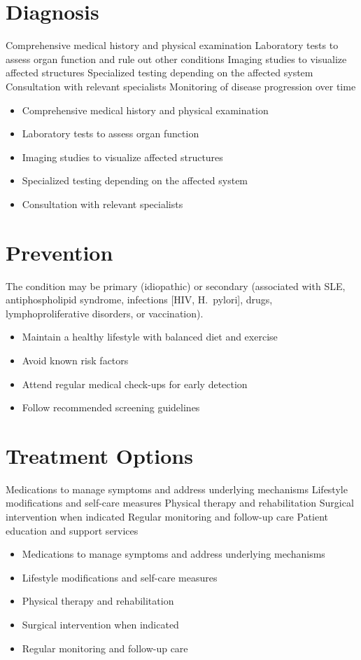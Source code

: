 \section{Diagnosis}
Comprehensive medical history and physical examination Laboratory tests to assess organ function and rule out other conditions Imaging studies to visualize affected structures Specialized testing depending on the affected system Consultation with relevant specialists Monitoring of disease progression over time

\begin{itemize}[noitemsep]
  \item Comprehensive medical history and physical examination
  \item Laboratory tests to assess organ function
  \item Imaging studies to visualize affected structures
  \item Specialized testing depending on the affected system
  \item Consultation with relevant specialists
\end{itemize}
\section{Prevention}
The condition may be primary (idiopathic) or secondary (associated with SLE, antiphospholipid syndrome, infections [HIV, H.~pylori], drugs, lymphoproliferative disorders, or vaccination).

\begin{itemize}[noitemsep]
  \item Maintain a healthy lifestyle with balanced diet and exercise
  \item Avoid known risk factors
  \item Attend regular medical check-ups for early detection
  \item Follow recommended screening guidelines
\end{itemize}
\section{Treatment Options}
Medications to manage symptoms and address underlying mechanisms Lifestyle modifications and self-care measures Physical therapy and rehabilitation Surgical intervention when indicated Regular monitoring and follow-up care Patient education and support services

\begin{itemize}[noitemsep]
  \item Medications to manage symptoms and address underlying mechanisms
  \item Lifestyle modifications and self-care measures
  \item Physical therapy and rehabilitation
  \item Surgical intervention when indicated
  \item Regular monitoring and follow-up care
\end{itemize}
